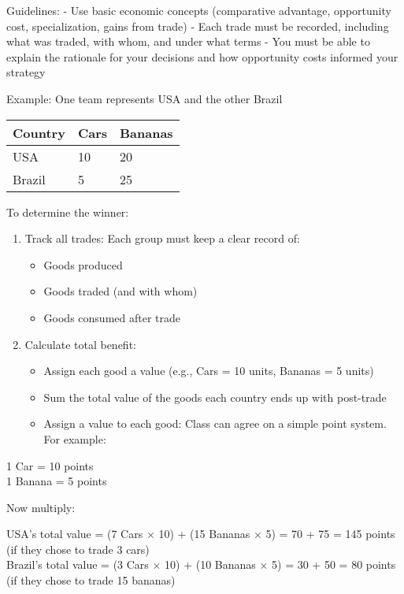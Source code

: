 \documentclass[
  11pt,
]{article}
\providecommand{\tightlist}{%
  \setlength{\itemsep}{0pt}\setlength{\parskip}{0pt}}
\begin{document}
Guidelines: - Use basic economic concepts (comparative advantage,
opportunity cost, specialization, gains from trade) - Each trade must be
recorded, including what was traded, with whom, and under what terms -
You must be able to explain the rationale for your decisions and how
opportunity costs informed your strategy

Example: One team represents USA and the other Brazil

\begin{longtable}[]{@{}lll@{}}
\toprule\noalign{}
Country & Cars & Bananas \\
\midrule\noalign{}
\endhead
\bottomrule\noalign{}
\endlastfoot
USA & 10 & 20 \\
Brazil & 5 & 25 \\
\end{longtable}

To determine the winner:

\begin{enumerate}
\def\labelenumi{\arabic{enumi}.}
\tightlist
\item
  Track all trades: Each group must keep a clear record of:

  \begin{itemize}
  \tightlist
  \item
    Goods produced
  \item
    Goods traded (and with whom)
  \item
    Goods consumed after trade
  \end{itemize}
\item
  Calculate total benefit:

  \begin{itemize}
  \tightlist
  \item
    Assign each good a value (e.g., Cars = 10 units, Bananas = 5 units)
  \item
    Sum the total value of the goods each country ends up with
    post-trade
  \item
    Assign a value to each good: Class can agree on a simple point
    system. For example:
  \end{itemize}
\end{enumerate}

1 Car = 10 points\\
1 Banana = 5 points

Now multiply:

USA's total value = (7 Cars × 10) + (15 Bananas × 5) = 70 + 75 = 145
points (if they chose to trade 3 cars)\\
Brazil's total value = (3 Cars × 10) + (10 Bananas × 5) = 30 + 50 = 80
points (if they chose to trade 15 bananas)
\end{document}
